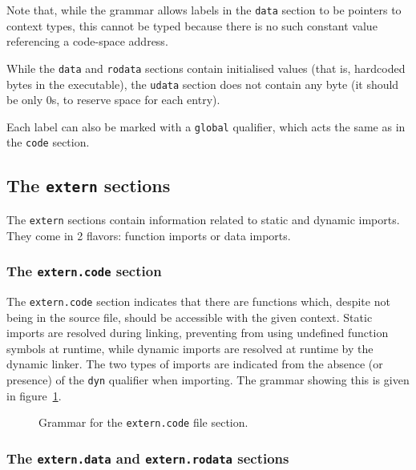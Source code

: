 \noindent Note that, while the grammar allows labels in the \texttt{data} section to be pointers to context types, this cannot be typed because there is no such constant value referencing a code-space address.

While the \texttt{data} and \texttt{rodata} sections contain initialised values (that is, hardcoded bytes in the executable), the \texttt{udata} section does not contain any byte (it should be only $0$s, to reserve space for each entry).

Each label can also be marked with a \texttt{global} qualifier, which acts the same as in the \texttt{code} section.

\subsection{The \texttt{extern} sections}\label{subsec:nstar-common-sections-extern}

The \texttt{extern} sections contain information related to static and dynamic imports.
They come in 2 flavors: function imports or data imports.

\subsubsection{The \texttt{extern.code} section}\label{subsubsec:nstar-common-sections-extern-code}

The \texttt{extern.code} section indicates that there are functions which, despite not being in the source file, should be accessible with the given context.
Static imports are resolved during linking, preventing from using undefined function symbols at runtime, while dynamic imports are resolved at runtime by the dynamic linker.
The two types of imports are indicated from the absence (or presence) of the \texttt{dyn} qualifier when importing.
The grammar showing this is given in figure~\ref{fig:nstar-common-sections-extern-code-grammar}.

\begin{figure}[htb]
  \centering

  \caption{Grammar for the \texttt{extern.code} file section.}
  \label{fig:nstar-common-sections-extern-code-grammar}
\end{figure}

\subsubsection{The \texttt{extern.data} and \texttt{extern.rodata} sections}\label{subsubsec:nstar-common-sections-extern-data}

